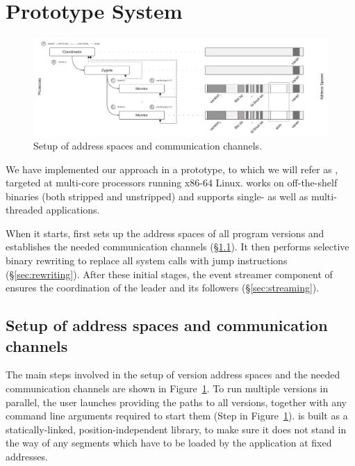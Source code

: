 \section{\vx Prototype System}
\label{sec:prototype}


\begin{figure}[t]
  \begin{center}
    \includegraphics[width=\textwidth]{efficient-execution/figures/address-space}
    \caption{Setup of address spaces and communication channels.}
    \label{fig:setup}
  \end{center}
\end{figure}


We have implemented our approach in a prototype, to which we will
refer as \vx, targeted at multi-core processors running x86-64 Linux.
\varan works on off-the-shelf binaries (both stripped and unstripped)
and supports single- as well as multi-threaded applications.

When it starts, \vx first sets up the address spaces of all program
versions and establishes the needed communication channels
(\S\ref{sec:setup}).  It then performs selective binary rewriting to
replace all system calls with  jump instructions
(\S\ref{sec:rewriting}).  After these initial stages, the event
streamer component of \vx ensures the coordination of the leader and
its followers (\S\ref{sec:streaming}).


\subsection{Setup of address spaces and communication channels}
\label{sec:setup}

The main steps involved in the setup of version address spaces and the
needed communication channels are shown in Figure~\ref{fig:setup}.  To
run multiple versions in parallel, the user launches \vx providing the
paths to all versions, together with any command line arguments required
to start them (Step  in Figure~\ref{fig:setup}). \vx is built
as a statically-linked, position-independent library, to make sure it
does not stand in the way of any segments which have to be loaded by the
application at fixed addresses.

